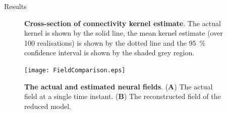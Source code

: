 \documentclass[final]{beamer}
\newlength{\sepwid}
\newlength{\onecolwid}
\begin{document}
\begin{frame}[t]
\begin{columns}[t]
\begin{column}{\onecolwid}
\begin{block}{Results}
\begin{figure}
\begin{center}
		\end{center}
		\caption{{\bf Cross-section of connectivity kernel estimate}. The actual kernel is shown by the solid line, the mean kernel estimate (over 100 realisations) is shown by the dotted line and the 95~\% confidence interval is shown by the shaded grey region.}
		\label{fig:Figure8}
		\end{figure}
				
		\begin{figure}
		\begin{center}
		\texttt{[image: FieldComparison.eps]}
		\end{center}
		\caption{{\bf The actual and estimated neural fields}. (\textbf{A}) The actual field at a single time instant. (\textbf{B}) The reconstructed field of the reduced model.}
		\label{fig:Figure10}
		\end{figure}
		
	\end{block}
\end{column}

	\begin{column}{\sepwid}\end{column}			%

 \end{columns}
\end{frame}
\end{document}
